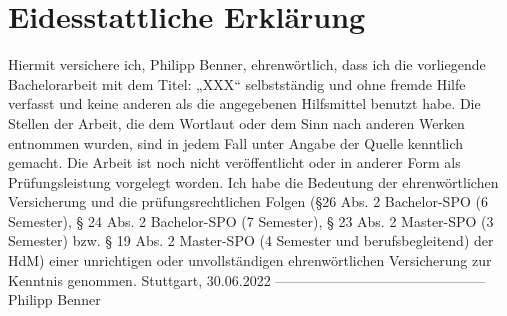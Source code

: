 \chapter*{Eidesstattliche Erklärung}
\thispagestyle{plain}


Hiermit versichere ich, Philipp Benner, ehrenwörtlich, dass ich die
vorliegende Bachelorarbeit mit dem Titel: „XXX“ selbstständig und ohne fremde Hilfe verfasst und keine
anderen als die angegebenen Hilfsmittel benutzt habe. Die Stellen der Arbeit, die dem
Wortlaut oder dem Sinn nach anderen Werken entnommen wurden, sind in jedem Fall
unter Angabe der Quelle kenntlich gemacht. Die Arbeit ist noch nicht veröffentlicht oder
in anderer Form als Prüfungsleistung vorgelegt worden.
Ich habe die Bedeutung der ehrenwörtlichen Versicherung und die prüfungsrechtlichen
Folgen (§26 Abs. 2 Bachelor-SPO (6 Semester), § 24 Abs. 2 Bachelor-SPO (7 Semester), §
23 Abs. 2 Master-SPO (3 Semester) bzw. § 19 Abs. 2 Master-SPO (4 Semester und
berufsbegleitend) der HdM) einer unrichtigen oder unvollständigen ehrenwörtlichen
Versicherung zur Kenntnis genommen.
\newline
\newline
\newline
\newline
\newline
Stuttgart, 30.06.2022
\newline
\newline
\newline
---------------------------------------------\\
Philipp Benner


